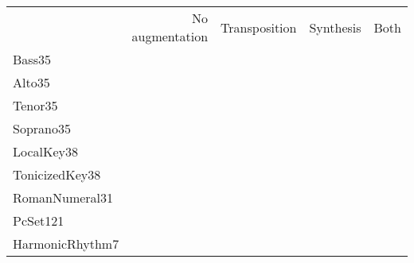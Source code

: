 
\begin{tabular}{lrrrr}
                &  No augmentation & Transposition & Synthesis & Both \\
Bass35          &                  &               &           &     \\
Alto35          &                  &               &           &     \\  
Tenor35         &                  &               &           &     \\
Soprano35       &                  &               &           &     \\
LocalKey38      &                  &               &           &     \\
TonicizedKey38  &                  &               &           &     \\
RomanNumeral31  &                  &               &           &     \\
PcSet121        &                  &               &           &     \\
HarmonicRhythm7 &                  &               &           &     \\
\end{tabular}
